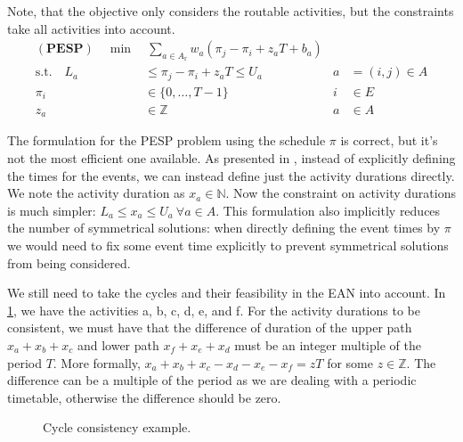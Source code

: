 \documentclass[english, 12pt, a4paper, sci, utf8, a-2b, online]{aaltothesis}
\newcommand{\N}{\mathbb{N}}
\newcommand{\Z}{\mathbb{Z}}
\newcommand{\Ar}{A_\text{r}}
\begin{document}
Note, that the objective only considers the routable activities, but the constraints take all activities into account.
\begin{align}
    \mathbf{(PESP)}\quad\min&\ \sum_{a \in \Ar} w_{a} (\pi_j-\pi_i+z_aT + b_a) \\
    \textrm{s.t.} \quad L_a &\leq \pi_j-\pi_i+z_aT  \leq U_a  &a &=(i,j)\in A \\
    \pi_i &\in \{0, \dots, T-1\} &i &\in E\\
    z_a &\in \Z &a &\in A
\end{align}



The formulation for the PESP problem using the schedule $\pi$ is correct, but it's not the most efficient one available. As presented in \cite{cycle-basis-original-2001}, instead of explicitly defining the times for the events, we can instead define just the activity durations directly. We note the activity duration as $x_a \in \N$. Now the constraint on activity durations is much simpler: $L_a \leq x_a \leq U_a\ \forall a \in A$. This formulation also implicitly reduces the number of symmetrical solutions: when directly defining the event times by $\pi$ we would need to fix some event time explicitly to prevent symmetrical solutions from being considered.

We still need to take the cycles and their feasibility in the EAN into account. In \cref{fig:cycle-example}, we have the activities a, b, c, d, e, and f. For the activity durations to be consistent, we must have that the difference of duration of the upper path $x_a + x_b + x_c$ and lower path $x_f + x_e + x_d$ must be an integer multiple of the period $T$. More formally, $x_a + x_b + x_c - x_d - x_e - x_f = zT$ for some $z\in \Z$. The difference can be a multiple of the period as we are dealing with a periodic timetable, otherwise the difference should be zero.

\begin{figure}
    \centering
    
    \caption{Cycle consistency example.}
    \label{fig:cycle-example}
\end{figure}

        
\end{document}
